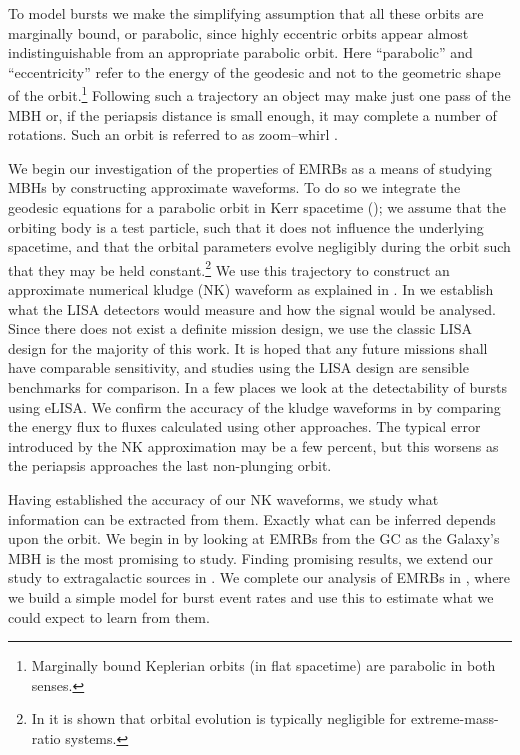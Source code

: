 To model bursts we make the simplifying assumption that all these orbits are marginally bound, or parabolic, since highly eccentric orbits appear almost indistinguishable from an appropriate parabolic orbit. Here ``parabolic'' and ``eccentricity'' refer to the energy of the geodesic and not to the geometric shape of the orbit.\footnote{Marginally bound Keplerian orbits (in flat spacetime) are parabolic in both senses.} Following such a trajectory an object may make just one pass of the MBH or, if the periapsis distance is small enough, it may complete a number of rotations. Such an orbit is referred to as zoom--whirl \citep{Glampedakis2002a}.

We begin our investigation of the properties of EMRBs as a means of studying MBHs by constructing approximate waveforms. To do so we integrate the geodesic equations for a parabolic orbit in Kerr spacetime (); we assume that the orbiting body is a test particle, such that it does not influence the underlying spacetime, and that the orbital parameters evolve negligibly during the orbit such that they may be held constant.\footnote{In  it is shown that orbital evolution is typically negligible for extreme-mass-ratio systems.} We use this trajectory to construct an approximate numerical kludge (NK) waveform \citep{Babak2007} as explained in . In  we establish what the LISA detectors would measure and how the signal would be analysed. Since there does not exist a definite mission design, we use the classic LISA design for the majority of this work. It is hoped that any future missions shall have comparable sensitivity, and studies using the LISA design are sensible benchmarks for comparison. In a few places we look at the detectability of bursts using eLISA. We confirm the accuracy of the kludge waveforms in  by comparing the energy flux to fluxes calculated using other approaches. The typical error introduced by the NK approximation may be a few percent, but this worsens as the periapsis approaches the last non-plunging orbit.

Having established the accuracy of our NK waveforms, we study what information can be extracted from them. Exactly what can be inferred depends upon the orbit. We begin in  by looking at EMRBs from the GC as the Galaxy's MBH is the most promising to study. Finding promising results, we extend our study to extragalactic sources in . We complete our analysis of EMRBs in , where we build a simple model for burst event rates and use this to estimate what we could expect to learn from them.

